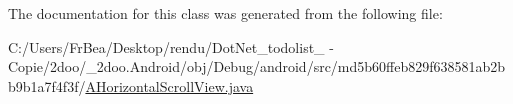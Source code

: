 The documentation for this class was generated from the following file:\begin{CompactItemize}
\item 
C:/Users/FrBea/Desktop/rendu/DotNet\_\-todolist\_ - Copie/2doo/\_\-2doo.Android/obj/Debug/android/src/md5b60ffeb829f638581ab2bb9b1a7f4f3f/\hyperlink{_a_horizontal_scroll_view_8java}{AHorizontalScrollView.java}\end{CompactItemize}

